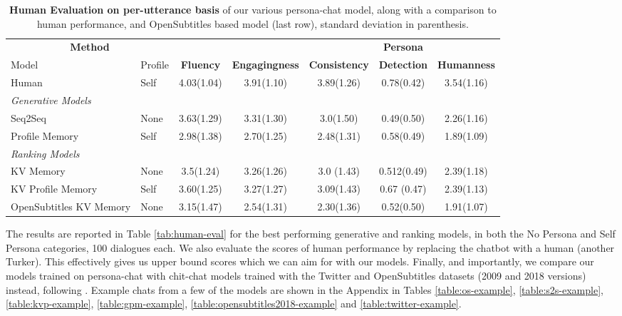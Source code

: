 \documentclass[11pt,a4paper]{article}
\begin{document}
\begin{table*}[t]
  \centering
  \begin{tabular}{ll|ccccc}
  \toprule
  \multicolumn{2}{c|}{{\bf Method}} & & & &  \textbf{Persona}   \\
   Model & Profile & \textbf{Fluency} &  \textbf{Engagingness} & \textbf{Consistency} & 
   \textbf{Detection}  & \textbf{Humanness} \\
  \midrule
  Human  & Self  & 4.03(1.04) & 3.91(1.10)   & 3.89(1.26) &  0.78(0.42) & 3.54(1.16)\\
  \midrule
  {\em Generative Models} & \\
  Seq2Seq & None              & 3.63(1.29)&  3.31(1.30) & 3.0(1.50) & 0.49(0.50) &2.26(1.16)\\ Profile Memory   & Self   &2.98(1.38) &  2.70(1.25) & 2.48(1.31) & 0.58(0.49) &1.89(1.09) \\
  \midrule
  {\em Ranking Models} & \\
  KV Memory   & None      & 3.5(1.24) & 3.26(1.26) & 3.0 (1.43) & 0.512(0.49) & 2.39(1.18)\\ 
  KV Profile Memory   & Self & 3.60(1.25) & 3.27(1.27)  & 3.09(1.43) & 0.67 (0.47) &2.39(1.13)\\ 
  \midrule
OpenSubtitles KV Memory & None & 3.15(1.47)  & 2.54(1.31) & 2.30(1.36)  & 0.52(0.50) &1.91(1.07)\\ 
  \bottomrule
  \end{tabular}
  \caption{{\bf Human Evaluation on per-utterance basis} of our various {\sc persona-chat} model, along with a  comparison to human performance, and OpenSubtitles based model (last row), standard deviation in parenthesis.
\label{tab:human-eval-2}
     } 
\end{table*}
\fi

The results are reported in Table \ref{tab:human-eval} for the best performing generative and ranking models, in both the No Persona and Self Persona categories, 100 dialogues each. We also evaluate the scores of human performance by replacing the chatbot with a human (another Turker). This effectively gives us upper bound scores which we can aim for with our models. Finally, and importantly, we compare our models trained on {\sc persona-chat} with chit-chat models trained with the Twitter and OpenSubtitles datasets (2009 and 2018 versions) instead, following . Example chats from a few of the models are shown in the Appendix in
Tables \ref{table:os-example}, \ref{table:s2s-example}, \ref{table:kvp-example}, \ref{table:gpm-example},
 \ref{table:opensubtitles2018-example} and \ref{table:twitter-example}. 
\end{document}
